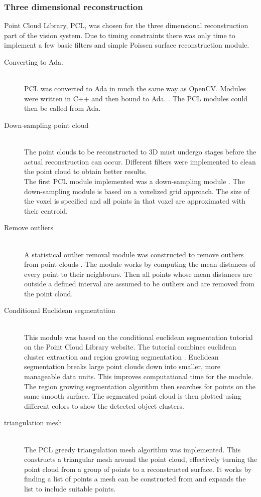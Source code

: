 \subsubsection{Three dimensional reconstruction} 
Point Cloud Library, PCL, was chosen for the three dimensional reconstruction part of the vision system. Due to timing constraints there was only time to implement a few basic filters and simple Poissen surface reconstruction module.
\begin{description}
\item[Converting to Ada.]\hfill \\
PCL was converted to Ada in much the same way as OpenCV. Modules were written in C++ and then bound to Ada. \cite{web:newAdaBindings}. The PCL modules could then be called from Ada.

\item[Down-sampling point cloud]\hfill \\
The point clouds to be reconstructed to 3D must undergo stages before the actual reconstruction can occur. Different filters were implemented to clean the point cloud to obtain better results.
\\The first PCL module implemented was a down-sampling module \cite{web:pclVoxel} . The down-sampling module is based on a voxelized grid approach. The size of the voxel is specified and all points in that voxel are approximated with their centroid.	

\item[Remove outliers]\hfill \\
A statistical outlier removal module was constructed to remove outliers from point clouds \cite{web:pclOutliers}. The module works by computing the mean distances of every point to their neighbours. Then all points whose mean distances are outside a defined interval are assumed to be outliers and are removed from the point cloud.

\item[Conditional Euclidean segmentation]\hfill \\
This module was based on the conditional euclidean segmentation tutorial on the Point Cloud Library website\cite{web:PCL}. The tutorial combines euclidean cluster extraction \cite{RusuDoctoralDissertation} and region growing segmentation \cite{web:pclRegionGrowing}. Euclidean segmentation breaks large point clouds down into smaller, more manageable data units. This improves computational time for the module. The region growing segmentation algorithm then searches for points on the same smooth surface. The segmented point cloud is then plotted using different colors to show the detected object clusters.

\item[triangulation mesh]\hfill \\
The PCL greedy triangulation mesh algorithm was implemented. This constructs a triangular mesh around the point cloud, effectively turning the point cloud from a group of points to a reconstructed surface. It works by finding a list of points a mesh can be constructed from and expands the list to include suitable points\cite{Marton09ICRA}. 
 
\end{description}